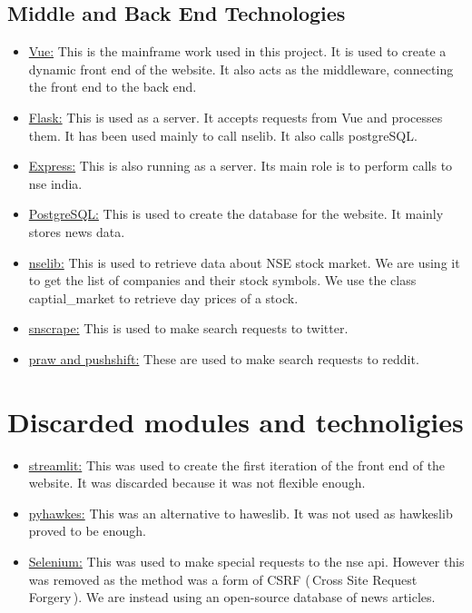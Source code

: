 \documentclass{article}
\begin{document}
\subsection{Middle and Back End Technologies}
\begin{itemize}
\item \underline{Vue:} This is the mainframe work used in this project. It is used to create a dynamic front end of the website. It also acts as the middleware, connecting the front end to the back end.
\item \underline{Flask:} This is used as a server. It accepts requests from Vue and processes them. It has been used mainly to call nselib. It also calls postgreSQL.
\item \underline{Express:} This is also running as a server. Its main role is to perform calls to nse india.
\item \underline{PostgreSQL:} This is used to create the database for the website. It mainly stores news data.
\item \underline{nselib:} This is used to retrieve data about NSE stock market. We are using it to get the list of companies and their stock symbols. We use the class captial\_market to retrieve day prices of a stock.
\item \underline{snscrape:} This is used to make search requests to twitter.
\item \underline{praw and pushshift:} These are used to make search requests to reddit.
\end{itemize}
\section{Discarded modules and technoligies}
\begin{itemize}
\item \underline{streamlit:} This was used to create the first iteration of the front end of the website. It was discarded because it was not flexible enough.
\item \underline{pyhawkes:} This was an alternative to haweslib. It was not used as hawkeslib proved to be enough.
\item \underline{Selenium:} This was used to make special requests to the nse api. However this was removed as the method was a form of CSRF (\,Cross Site Request Forgery\,). We are instead using an open-source database of news articles.
\end{itemize}
\end{document}
